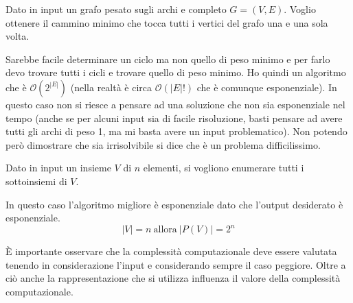\begin{esempio}
    Dato in input un grafo pesato sugli archi e completo $G = (V, E)$. Voglio
    ottenere il cammino minimo che tocca tutti i vertici del grafo una e una
    sola volta.

    Sarebbe facile determinare un ciclo ma non quello di peso minimo e per farlo
    devo trovare tutti i cicli e trovare quello di peso minimo. Ho quindi un
    algoritmo che è $\mathcal{O}(2^{|E|})$ (nella realtà è circa $\mathcal{O}
        (|E|!)$ che è comunque esponenziale). In questo caso non si riesce a
    pensare ad una soluzione che non sia esponenziale nel tempo (anche se per
    alcuni input sia di facile risoluzione, basti pensare ad avere tutti gli
    archi di peso 1, ma mi basta avere un input problematico). Non potendo però
    dimostrare che sia irrisolvibile si dice che è un problema difficilissimo.
\end{esempio}
\begin{esempio} 
    Dato in input un insieme $V$ di $n$ elementi, si vogliono enumerare tutti i
    sottoinsiemi di $V$.

    In questo caso l'algoritmo migliore è esponenziale dato che l'output
    desiderato è esponenziale.
    \begin{equation}
        |V| = n \ \text{allora} \ |P(V)| = 2^n
    \end{equation}
\end{esempio}
È importante osservare che la complessità computazionale deve essere valutata
tenendo in considerazione l'input e considerando sempre il caso peggiore. Oltre
a ciò anche la rappresentazione che si utilizza influenza il valore della
complessità computazionale.